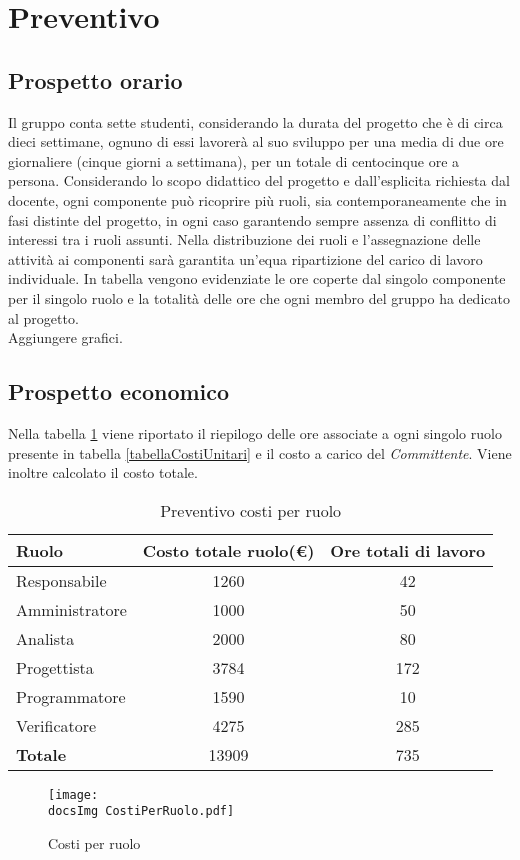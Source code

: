 \section{Preventivo}{
	\subsection{Prospetto orario}{
		Il gruppo conta sette studenti, considerando la durata del progetto che è di circa dieci settimane, ognuno di essi lavorerà al suo sviluppo per una media di due ore giornaliere (cinque giorni a settimana), per un totale di centocinque ore a persona.
Considerando lo scopo didattico del progetto e dall'esplicita richiesta dal docente, ogni componente può ricoprire più ruoli, sia contemporaneamente che in fasi distinte del progetto, in ogni caso garantendo sempre assenza di conflitto di interessi tra i ruoli assunti. Nella distribuzione dei ruoli e l'assegnazione delle attività ai componenti sarà garantita un'equa ripartizione del carico di lavoro individuale.
In tabella vengono evidenziate le ore coperte dal singolo componente per il singolo ruolo e la totalità delle ore che ogni membro del gruppo ha dedicato al progetto.
\\Aggiungere grafici.
}
	\subsection{Prospetto economico}{
		Nella tabella \ref{CostiRuolo} viene riportato il riepilogo delle ore associate a ogni singolo ruolo presente in tabella \ref{tabellaCostiUnitari} e il costo a carico del \textit{Committente}. Viene inoltre calcolato il costo totale. \\
	\begin{table}[h!]
	 \centering
		\begin{tabular}{l c c}		
				\toprule
				Ruolo&	Costo totale ruolo(\euro)&	Ore totali di lavoro \\ 
				\midrule
				Responsabile&	1260	&	42\\
				Amministratore&	1000	& 50\\
				Analista&	2000	&	80\\
				Progettista&		3784&	172\\
				Programmatore&	1590	&	10\\
				Verificatore&	4275&	285\\ \hline
				\textbf{Totale}&	 13909&	735\\
				\bottomrule
			\end{tabular}
			\caption{Preventivo costi per ruolo}	
			 \label{CostiRuolo}
	\end{table}	
	\begin{figure}[h!]
	\centering
		\texttt{[image: \\docsImg CostiPerRuolo.pdf]}
		\caption{Costi per ruolo} 
	\end{figure} 
	}
}
